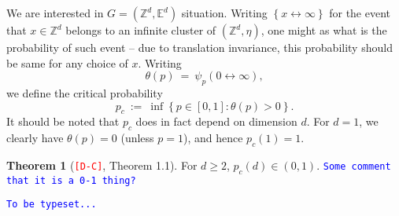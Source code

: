 \documentclass[12pt]{article}
\newcommand{\Z}{\mathbb{Z}}
\newcommand{\set}[1]{\left\{#1\right\}}
\newcommand{\1}{\mathbbm{1}}
\newcommand{\5}{\vspace{0.5cm}}
\theoremstyle{definition}
\newtheorem{thm}{Theorem}[section]
\begin{document}
We are interested in $G=(\Z^d,\mathbb{E}^d)$ situation. Writing $\set{x\leftrightarrow\infty}$ for the event that $x\in\Z^d$ belongs to an infinite cluster of $(\Z^d,\eta)$, one might as  what is the probability of such event -- due to translation invariance, this probability should be same for any choice of $x$. Writing
$$\theta(p) ~=~ \psi_p(0\leftrightarrow\infty),$$
we define the critical probability
$$p_c ~:=~ \inf\set{p\in[0,1]:\theta(p)>0}.$$
It should be noted that $p_c$ does in fact depend on dimension $d$. For $d=1$, we clearly have $\theta(p)=0$ (unless $p=1$), and hence $p_c(1)=1$. 

\begin{thm}[\textcolor{red}{\texttt{[D-C]}}, Theorem 1.1]
For $d\geq 2$, $p_c(d)\in (0,1)$. \textcolor{blue}{\texttt{Some comment that it is a 0-1 thing?}}
\end{thm} 


\pagebreak


\begin{thebibliography}{++}
\textcolor{blue}{\texttt{To be typeset...}}
\end{thebibliography}

\end{document}
